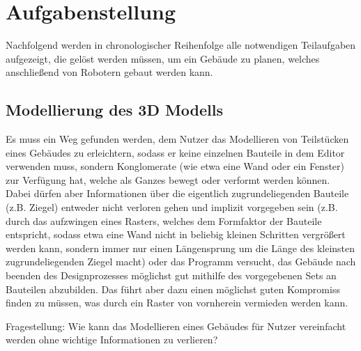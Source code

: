 \chapter{Aufgabenstellung}
Nachfolgend werden in chronologischer Reihenfolge alle notwendigen Teilaufgaben aufgezeigt, die gelöst werden müssen, um ein Gebäude zu planen, welches anschließend von Robotern gebaut werden kann.

\section{Modellierung des 3D Modells}
Es muss ein Weg gefunden werden, dem Nutzer das Modellieren von Teilstücken eines Gebäudes zu erleichtern, sodass er keine einzelnen Bauteile in dem Editor verwenden muss, sondern Konglomerate (wie etwa eine Wand oder ein Fenster) zur Verfügung hat, welche als Ganzes bewegt oder verformt werden können.
Dabei dürfen aber Informationen über die eigentlich zugrundeliegenden Bauteile (z.B. Ziegel) entweder nicht verloren gehen und implizit vorgegeben sein (z.B. durch das aufzwingen eines Rasters, welches dem Formfaktor der Bauteile entspricht, sodass etwa eine Wand nicht in beliebig kleinen Schritten vergrößert werden kann, sondern immer nur einen Längensprung um die Länge des kleinsten zugrundeliegenden Ziegel macht) oder das Programm versucht, das Gebäude nach beenden des Designprozesses möglichst gut mithilfe des vorgegebenen Sets an Bauteilen abzubilden. Das führt aber dazu einen möglichst guten Kompromiss finden zu müssen, was durch ein Raster von vornherein vermieden werden kann.

Fragestellung: Wie kann das Modellieren eines Gebäudes für Nutzer vereinfacht werden ohne wichtige Informationen zu verlieren?


